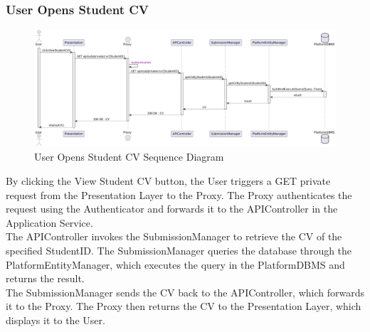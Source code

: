 \subsubsection*{User Opens Student CV}
\begin{figure}[H]
    \centering
    \includegraphics[width=\linewidth]{Latex/Images/DD/SequenceDiagrams/5UserOpensStudentCV.png}
    \caption{User Opens Student CV Sequence Diagram}
    \label{fig:useropensstudentcv}
\end{figure}
By clicking the View Student CV button, the User triggers a GET private request from the Presentation Layer to the Proxy. The Proxy authenticates the request using the Authenticator and forwards it to the APIController in the Application Service.\\
The APIController invokes the SubmissionManager to retrieve the CV of the specified StudentID. The SubmissionManager queries the database through the PlatformEntityManager, which executes the query in the PlatformDBMS and returns the result.\\
The SubmissionManager sends the CV back to the APIController, which forwards it to the Proxy. The Proxy then returns the CV to the Presentation Layer, which displays it to the User.

